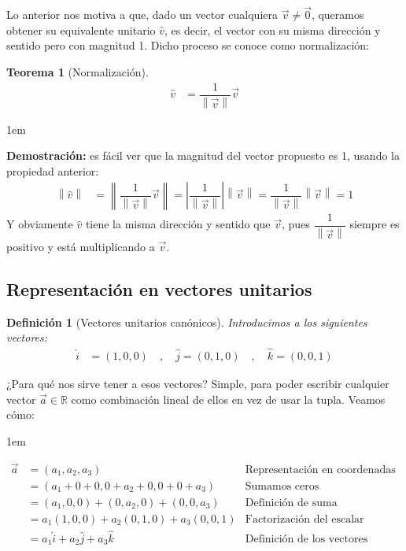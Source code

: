 \documentclass[12pt, fleqn]{report}                             %
\newenvironment{SmallIndentation}[1][0.75em]                    %
    {\begin{adjustwidth}{#1}{}\begin{footnotesize}}                 %
    {\end{footnotesize}\end{adjustwidth}}                           %
\newcommand{\abs}[1]{\left\lvert #1 \right\lvert}				%
\newcommand{\Abs}[1]{\left\lVert #1 \right\lVert}				%
\newtheorem{Theorem}{Teorema}[section]                          %
\newtheorem{Definition}{Definición}[section]                    %
\newcommand{\ve}[1]{\vec{#1}}									%
\begin{document}
			Lo anterior nos motiva a que, dado un vector cualquiera $\ve{v} \neq \ve{0}$, queramos obtener su equivalente unitario $\hat{v}$, es decir, el vector con su misma dirección y sentido pero con magnitud 1. Dicho proceso se conoce como normalización:
			\begin{Theorem}[Normalización]
				\begin{align}
					\hat{v} &= \dfrac{1}{\Abs{\ve{v}}} \ve{v}
				\end{align}
			\end{Theorem}
		
			\begin{SmallIndentation}[1em]
				\textbf{Demostración:} es fácil ver que la magnitud del vector propuesto es 1, usando la propiedad anterior:
				\begin{align*}
					\Abs{\hat{v}} &= \Abs{\dfrac{1}{\Abs{\ve{v}}} \ve{v}} = \abs{\dfrac{1}{\Abs{\vec{v}}}} \Abs{\ve{v}} = \dfrac{1}{\Abs{\ve{v}}} \Abs{\ve{v}} = 1
				\end{align*}
				Y obviamente $\hat{v}$ tiene la misma dirección y sentido que $\ve{v}$, pues $\dfrac{1}{\Abs{\ve{v}}}$ siempre es positivo y está multiplicando a $\ve{v}$.
			\end{SmallIndentation}
			
			\subsection{Representación en vectores unitarios}
			
			\begin{Definition}[Vectores unitarios canónicos]
				Introducimos a los siguientes vectores:
				\begin{align}
					\hat{i} &= (1, 0, 0) \quad , \quad \hat{j} = (0, 1, 0) \quad , \quad \hat{k} = (0, 0, 1)
				\end{align}
			\end{Definition}
		
			¿Para qué nos sirve tener a esos vectores? Simple, para poder escribir cualquier vector $\ve{a} \in \mathbb{R}$ como combinación lineal de ellos en vez de usar la tupla. Veamos cómo:
			\begin{SmallIndentation}[1em]
				\begin{align*}
					\ve{a} &= (a_1, a_2, a_3) &\mbox{Representación en coordenadas}\\
					&= (a_1 + 0 + 0, 0 + a_2 + 0, 0 + 0 + a_3) &\mbox{Sumamos ceros convenientemente}\\
					&= (a_1, 0, 0) + (0, a_2, 0) + (0, 0, a_3) &\mbox{Definición de suma}\\
					&= a_1(1, 0, 0) + a_2(0, 1, 0) + a_3(0, 0, 1) &\mbox{Factorización del escalar}\\
					&= \boxed{a_1\hat{i} + a_2\hat{j} + a_3\hat{k}} &\mbox{Definición de los vectores canónicos}
				\end{align*}
			\end{SmallIndentation}
		
\end{document}
